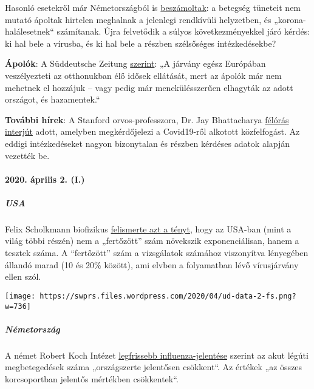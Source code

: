 Hasonló esetekről már Németországból is
\href{https://web.archive.org/web/20200330082928/https://www.sueddeutsche.de/panorama/coronavirus-news-deutschland-wolfsburg-laschet-1.4828033}{beszámoltak}:
a betegség tüneteit nem mutató ápoltak hirtelen meghalnak a jelenlegi
rendkívüli helyzetben, és „korona-halálesetnek`` számítanak. Újra
felvetődik a súlyos következményekkel járó kérdés: ki hal bele a
vírusba, és ki hal bele a részben szélsőséges intézkedésekbe?

\textbf{Ápolók}: A Süddeutsche Zeitung
\href{https://www.sueddeutsche.de/politik/coronavirus-pflegekraefte-ausland-1.4866124}{szerint}:
„A járvány egész Európában veszélyezteti az otthonukban élő idősek
ellátását, mert az ápolók már nem mehetnek el hozzájuk -- vagy pedig már
menekülésszerűen elhagyták az adott országot, és hazamentek.``

\textbf{További hírek}: A Stanford orvos-professzora, Dr. Jay
Bhattacharya \href{https://www.youtube.com/watch?v=-UO3Wd5urg0}{félórás
interjút} adott, amelyben megkérdőjelezi a Covid19-ről alkotott
közfelfogást. Az eddigi intézkedéseket nagyon bizonytalan és részben
kérdéses adatok alapján vezették be.

\hypertarget{2020-uxe1prilis-2-i}{%
\paragraph{2020. április 2. (I.)}\label{2020-uxe1prilis-2-i}}

\hypertarget{usa}{%
\subparagraph{\texorpdfstring{\textbf{USA}}{USA}}\label{usa}}

Felix Scholkmann biofizikus
\href{https://swprs.org/rate-of-positive-covid19-tests/}{felismerte azt
a tényt}, hogy az USA-ban (mint a világ többi részén) nem a „fertőzött''
szám növekszik exponenciálisan, hanem a tesztek száma. A ``fertőzött''
szám a vizsgálatok számához viszonyítva lényegében állandó marad (10 és
20\% között), ami elvben a folyamatban lévő vírusjárvány ellen szól.

\texttt{[image: https://swprs.files.wordpress.com/2020/04/ud-data-2-fs.png?w=736]}

\hypertarget{nuxe9metorszuxe1g}{%
\subparagraph{\texorpdfstring{\textbf{Németország}}{Németország}}\label{nuxe9metorszuxe1g}}

A német Robert Koch Intézet
\href{https://influenza.rki.de/Wochenberichte/2019_2020/2020-13.pdf}{legfrissebb
influenza-jelentése} szerint az akut légúti megbetegedések száma
„országszerte jelentősen csökkent``. Az értékek „az összes korcsoportban
jelentős mértékben csökkentek``.

